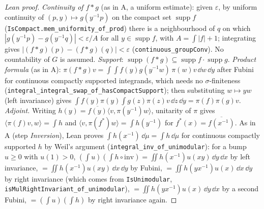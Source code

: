 \begin{proof}[Lean proof]
\emph{Continuity of $f\ast g$} (as in A, a uniform estimate): given $\varepsilon$, by uniform continuity of $(p,y)\mapsto g(y^{-1}p)$ on the compact set $\operatorname{supp}f$ (\texttt{IsCompact.mem\_uniformity\_of\_prod}) there is a neighbourhood of $q$ on which $|g(y^{-1}p)-g(y^{-1}q)|<\varepsilon/A$ for all $y\in\operatorname{supp}f$, with $A=\int|f|+1$; integrating gives $|(f\ast g)(p)-(f\ast g)(q)|<\varepsilon$ (\texttt{continuous\_groupConv}). No countability of $G$ is assumed. \emph{Support}: $\operatorname{supp}(f\ast g)\subseteq\operatorname{supp}f\cdot\operatorname{supp}g$. \emph{Product formula} (as in A): $\pi(f\ast g)v=\int\!\!\int f(y)g(y^{-1}w)\,\pi(w)v\,\dd w\,\dd y$ after Fubini for continuous compactly supported integrands, which needs no $\sigma$-finiteness (\texttt{integral\_integral\_swap\_of\_hasCompactSupport}); then substituting $w\mapsto yw$ (left invariance) gives $\int f(y)\pi(y)\int g(z)\pi(z)v\,\dd z\,\dd y=\pi(f)\pi(g)v$. \emph{Adjoint.} Writing $h(y)=\overline{f(y)}\langle v,\pi(y^{-1})w\rangle$, unitarity of $\pi$ gives $\langle\pi(f)v,w\rangle=\int h$ and $\langle v,\pi(f^*)w\rangle=\int h(y^{-1})$ for $f^*(x)=\overline{f(x^{-1})}$. As in A (step \emph{Inversion}), Lean proves $\int h(x^{-1})\,\dd\mu=\int h\,\dd\mu$ for continuous compactly supported $h$ by Weil's argument (\texttt{integral\_inv\_of\_unimodular}): for a bump $u\ge0$ with $u(1)>0$, $(\int u)(\int h\circ\mathrm{inv})=\iint h(x^{-1})u(xy)\,\dd y\,\dd x$ by left invariance, $=\iint h(x^{-1})u(xy)\,\dd x\,\dd y$ by Fubini, $=\iint h(yx^{-1})u(x)\,\dd x\,\dd y$ by right invariance (which comes from \texttt{IsUnimodular}, \texttt{isMulRightInvariant\_of\_unimodular}), $=\iint h(yx^{-1})u(x)\,\dd y\,\dd x$ by a second Fubini, $=(\int u)(\int h)$ by right invariance again.
\end{proof}

